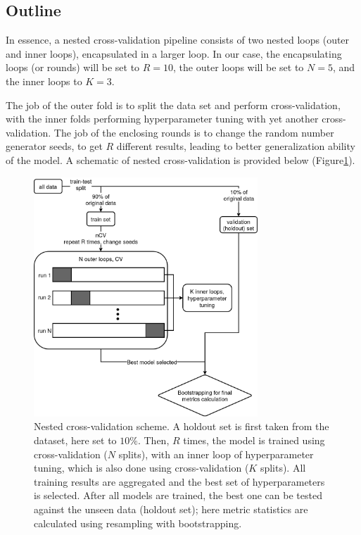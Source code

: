 \documentclass[12pt]{article}
\begin{document}
\subsection{Outline}

In essence, a nested cross-validation pipeline consists of two nested loops
(outer and inner loops), encapsulated in a larger loop. In our case, the
encapsulating loops (or rounds) will be set to $R=10$, the outer loops will be
set to $N=5$, and the inner loops to $K=3$.

The job of the outer fold is to split the data set and perform cross-validation,
with the inner folds performing hyperparameter tuning with yet another
cross-validation. The job of the enclosing rounds is to change the random number
generator seeds, to get $R$ different results, leading to better generalization
ability of the model. A schematic of nested cross-validation is provided below
(Figure\ref{fig:ncv_scheme}).

\begin{figure}[H]
    \centering
    \includegraphics[width=0.75\textwidth]{ims/nCV.drawio.png}
    \caption{Nested cross-validation scheme. A holdout set is first taken from
    the dataset, here set to $10\%$. Then, $R$ times, the model is trained
    using cross-validation ($N$ splits), with an inner loop of hyperparameter
    tuning, which is also done using cross-validation ($K$ splits). All
    training results are aggregated and the best set of hyperparameters
    is selected. After all models are trained, the best one can be tested
    against the unseen data (holdout set); here metric statistics are
    calculated using resampling with bootstrapping.}
    \label{fig:ncv_scheme}
\end{figure}
\end{document}
